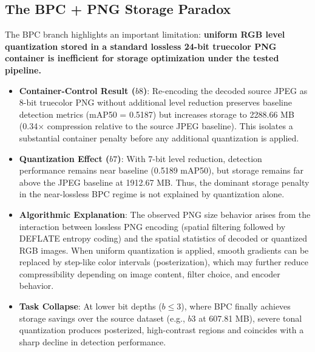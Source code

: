 \documentclass[12pt, a4paper]{article}
\begin{document}
\subsection{The BPC + PNG Storage Paradox}
The BPC branch highlights an important limitation: \textbf{uniform RGB level quantization stored in a standard lossless 24-bit truecolor PNG container is inefficient for storage optimization under the tested pipeline.}
\begin{itemize}
    \item \textbf{Container-Control Result ($b8$)}: Re-encoding the decoded source JPEG as 8-bit truecolor PNG without additional level reduction preserves baseline detection metrics (mAP50 = 0.5187) but increases storage to 2288.66 MB (0.34$\times$ compression relative to the source JPEG baseline). This isolates a substantial container penalty before any additional quantization is applied.
    \item \textbf{Quantization Effect ($b7$)}: With 7-bit level reduction, detection performance remains near baseline (0.5189 mAP50), but storage remains far above the JPEG baseline at 1912.67 MB. Thus, the dominant storage penalty in the near-lossless BPC regime is not explained by quantization alone.
    \item \textbf{Algorithmic Explanation}: The observed PNG size behavior arises from the interaction between lossless PNG encoding (spatial filtering followed by DEFLATE entropy coding) \cite{w3c2003} and the spatial statistics of decoded or quantized RGB images. When uniform quantization is applied, smooth gradients can be replaced by step-like color intervals (posterization), which may further reduce compressibility depending on image content, filter choice, and encoder behavior.
    \item \textbf{Task Collapse}: At lower bit depths ($b \le 3$), where BPC finally achieves storage savings over the source dataset (e.g., $b3$ at 607.81 MB), severe tonal quantization produces posterized, high-contrast regions and coincides with a sharp decline in detection performance.
\end{itemize}
\end{document}

